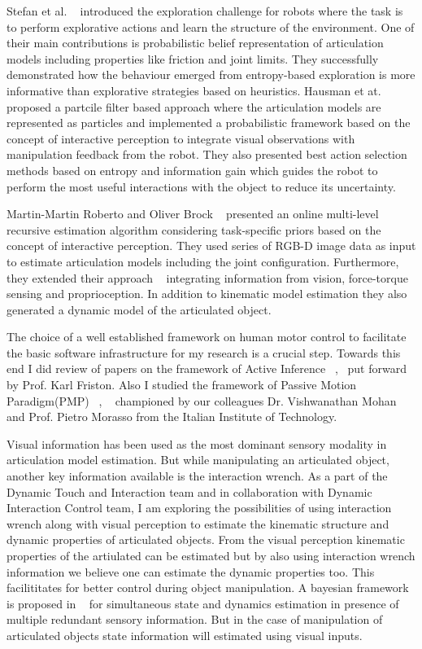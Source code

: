 \documentclass[12pt,a4paper]{report}
\begin{document}
Stefan et al. ~\cite{otte2014entropy} introduced the exploration challenge for robots where the task is to perform explorative actions and learn the structure of the environment. One of their main contributions is probabilistic belief representation of articulation models including properties like friction and joint limits. They successfully demonstrated how the behaviour emerged from entropy-based exploration is more informative than explorative strategies based on heuristics. Hausman et at. ~\cite{hausman2015active} proposed a partcile filter based approach where the articulation models are represented as particles and implemented a probabilistic framework based on the concept of interactive perception to integrate visual observations with manipulation feedback from the robot. They also presented best action selection methods based on entropy and information gain which guides the robot to perform the most useful interactions with the object to reduce its uncertainty.

Martin-Martin Roberto and Oliver Brock ~\cite{martin2014online} presented an online multi-level recursive estimation algorithm considering task-specific priors based on the concept of interactive perception. They used series of RGB-D image data as input to estimate articulation models including the joint configuration. Furthermore, they extended their approach ~\cite{martin2017building} integrating information from vision, force-torque sensing and proprioception. In addition to kinematic model estimation they also generated a dynamic model of the articulated object. 

The choice of a well established framework on human motor control to facilitate the basic software infrastructure for my research is a crucial step. Towards this end I did review of papers on the framework of Active Inference ~\cite{friston2015active},~\cite{friston2011action} put forward by Prof. Karl Friston. Also I studied the framework of Passive Motion Paradigm(PMP) ~\cite{mohan2011passive}, ~\cite{mohan2013inference} championed by our colleagues Dr. Vishwanathan Mohan and Prof. Pietro Morasso from the Italian Institute of Technology.

Visual information has been used as the most dominant sensory modality in articulation model estimation. But while manipulating an articulated object, another key information available is the interaction wrench. As a part of the Dynamic Touch and Interaction team and in collaboration with Dynamic Interaction Control  team, I am  exploring the possibilities of using interaction wrench along with visual perception  to estimate the kinematic structure and dynamic properties of articulated objects. From the visual perception kinematic properties of the artiulated can be estimated but by also using interaction wrench information we believe one can estimate the dynamic properties too. This facilititates for better control during object manipulation. A bayesian framework is proposed in ~\cite{nori2015simultaneous} for simultaneous state and dynamics estimation in presence of multiple redundant sensory information. But in the case of manipulation of articulated objects state information will estimated using visual inputs. 
 
\end{document}
